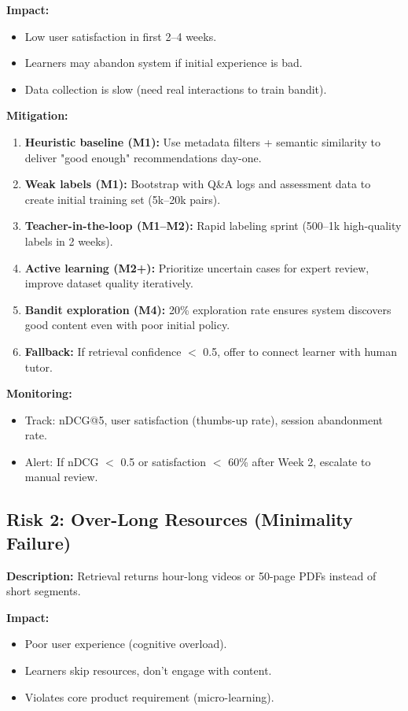 \documentclass[11pt,letterpaper]{article}
\begin{document}
\textbf{Impact:}
\begin{itemize}
\item Low user satisfaction in first 2--4 weeks.
\item Learners may abandon system if initial experience is bad.
\item Data collection is slow (need real interactions to train bandit).
\end{itemize}

\textbf{Mitigation:}
\begin{enumerate}
\item \textbf{Heuristic baseline (M1):} Use metadata filters + semantic similarity to deliver "good enough" recommendations day-one.
\item \textbf{Weak labels (M1):} Bootstrap with Q\&A logs and assessment data to create initial training set (5k--20k pairs).
\item \textbf{Teacher-in-the-loop (M1--M2):} Rapid labeling sprint (500--1k high-quality labels in 2 weeks).
\item \textbf{Active learning (M2+):} Prioritize uncertain cases for expert review, improve dataset quality iteratively.
\item \textbf{Bandit exploration (M4):} 20\% exploration rate ensures system discovers good content even with poor initial policy.
\item \textbf{Fallback:} If retrieval confidence $<$ 0.5, offer to connect learner with human tutor.
\end{enumerate}

\textbf{Monitoring:}
\begin{itemize}
\item Track: nDCG@5, user satisfaction (thumbs-up rate), session abandonment rate.
\item Alert: If nDCG $<$ 0.5 or satisfaction $<$ 60\% after Week 2, escalate to manual review.
\end{itemize}

\subsection{Risk 2: Over-Long Resources (Minimality Failure)}

\textbf{Description:} Retrieval returns hour-long videos or 50-page PDFs instead of short segments.

\textbf{Impact:}
\begin{itemize}
\item Poor user experience (cognitive overload).
\item Learners skip resources, don't engage with content.
\item Violates core product requirement (micro-learning).
\end{itemize}
\end{document}
